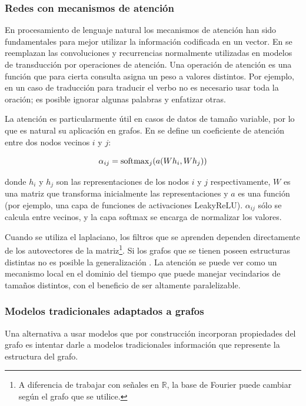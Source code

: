 \documentclass[
    left=2.0cm,         %
    right=2.0cm,        %
    top=2.0cm,          %
    bottom=2.5cm,         %
    bindingoffset=6mm,  %
    nohyphenation=false %
]{eiti/eiti-thesis}
\begin{document}
\subsubsection{Redes con mecanismos de atención}

En procesamiento de lenguaje natural los mecanismos de atención han sido fundamentales
para mejor utilizar la información codificada en un vector. En \cite{attentionalyouneed}
se reemplazan las convoluciones y recurrencias normalmente utilizadas en modelos
de transducción por operaciones de atención. Una operación de atención es una función
que para cierta consulta asigna un peso a valores distintos. Por ejemplo, en un caso
de traducción para traducir el verbo no es necesario usar toda la oración; es posible
ignorar algunas palabras y enfatizar otras.

La atención es particularmente útil en casos de datos de tamaño variable, por lo que
es natural su aplicación en grafos. En \cite{GAT} se define un coeficiente de atención entre
dos nodos vecinos $i$ y $j$:

\begin{equation*}
    \Large
    \alpha_{ij} = \mathrm{softmax}_j(a(Wh_i, Wh_j))
\end{equation*}

donde $h_i$ y $h_j$ son las representaciones de los nodos $i$ y $j$ respectivamente,
$W$ es una matriz que transforma inicialmente las representaciones y $a$ es una función (por ejemplo,
una capa de funciones de activaciones LeakyReLU). $\alpha_{ij}$ sólo se
calcula entre vecinos, y la capa softmax se encarga de normalizar los valores.

Cuando se utiliza el laplaciano, los filtros que se aprenden dependen directamente
de los autovectores de la matriz\footnote{A diferencia de trabajar con señales en $\mathbb{R}$, 
la base de Fourier puede cambiar según el grafo que se utilice.}. Si los grafos que
se tienen poseen estructuras
distintas no es posible la generalización \cite{monti2017geometric} \cite{GAT}. 
La atención se puede ver como un mecanismo
local en el dominio del tiempo que puede manejar vecindarios de tamaños distintos, con
el beneficio de ser altamente paralelizable.


\subsubsection{Modelos tradicionales adaptados a grafos}

Una alternativa a usar modelos que por construcción incorporan propiedades del
grafo es intentar darle a modelos tradicionales información que represente
la estructura del grafo. 
\end{document}
